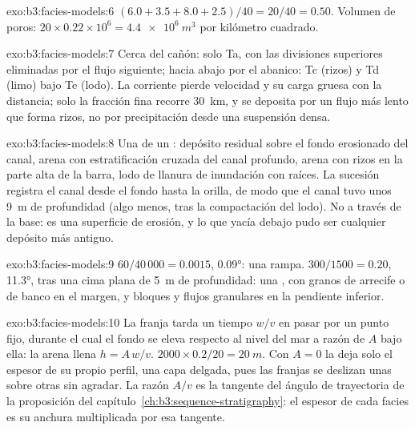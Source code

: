 \begin{solution}{exo:b3:facies-models:6}
$(6.0 + 3.5 + 8.0 + 2.5)/40 = 20/40 = 0.50$. Volumen de poros: $20\times0.22
\times10^6 = \qty{4.4e6}{m^3}$ por kilómetro cuadrado.
\end{solution}

\begin{solution}{exo:b3:facies-models:7}
Cerca del cañón: solo Ta, con las divisiones superiores eliminadas por el flujo siguiente; hacia abajo
por el abanico: Tc (rizos) y Td (limo) bajo Te (lodo). La corriente pierde velocidad
y su carga gruesa con la distancia; solo la fracción fina recorre
\qty{30}{km}, y se deposita por un flujo más lento que forma rizos, no
por precipitación desde una suspensión densa.
\end{solution}

\begin{solution}{exo:b3:facies-models:8}
Una  de un : depósito residual sobre el fondo erosionado del canal,
arena con estratificación cruzada del canal profundo, arena con rizos en la parte alta de la barra,
lodo de llanura de inundación con raíces. La sucesión registra el canal desde el fondo hasta
la orilla, de modo que el canal tuvo unos \qty{9}{m} de profundidad (algo menos, tras
la compactación del lodo). No a través de la base: es una superficie de erosión, y
lo que yacía debajo pudo ser cualquier depósito más antiguo.
\end{solution}

\begin{solution}{exo:b3:facies-models:9}
$60/40\,000 = 0.0015$, \ang{0.09}: una rampa. $300/1500 = 0.20$, \ang{11.3},
tras una cima plana de \qty{5}{m} de profundidad: una , con granos de arrecife o de banco
en el margen, y bloques y flujos granulares en la pendiente inferior.
\end{solution}

\begin{solution}{exo:b3:facies-models:10}
La franja tarda un tiempo $w/v$ en pasar por un punto fijo, durante el cual el fondo
se eleva respecto al nivel del mar a razón de $A$ bajo ella: la arena llena $h = A\,w/v$.
$2000\times0.2/20 = \qty{20}{m}$. Con $A = 0$ la  deja solo
el espesor de su propio perfil, una capa delgada, pues las franjas se deslizan unas sobre otras
sin agradar. La razón $A/v$ es la tangente del ángulo de trayectoria
de la proposición del capítulo~\ref{ch:b3:sequence-stratigraphy}: el
espesor de cada facies es su anchura multiplicada por esa tangente.
\end{solution}

